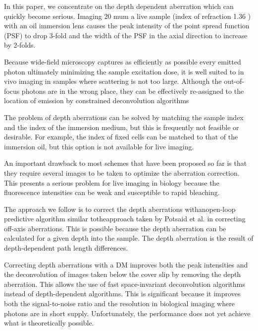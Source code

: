In this paper, we concentrate on the depth dependent aberration which can 
quickly become serious. Imaging 20 mum a live sample (index of refraction 1.36
) with an oil immersion lens causes the peak intensity of the point spread 
function (PSF) to drop 3-fold and the width of the PSF in the axial direction 
to increase by 2-folds. \cite{wide_AOM_FM_spehrical_correction} 

Because wide-field microscopy captures as efficiently as possible every 
emitted photon ultimately minimizing the sample excitation dose, it is well 
suited to in vivo imaging in samples where scattering is not too large. 
Although the out-of-focus photons are in the wrong place, they can be 
effectively re-assigned to the location of emission by constrained 
deconvolution algorithms \cite{wide_deconvolution}

The problem of depth aberrations can be solved by matching the sample index 
and the index of the immersion medium, but this is frequently not feasible or 
desirable. For example, the index of fixed cells can be matched to that of 
the immersion oil, but this option is not available for live imaging.

An important drawback to most schemes that have been proposed so far is that 
they require several images to be taken to optimize the aberration 
correction. This presents a serious problem for live imaging in biology 
because the fluorescence intensities can be weak and susceptible to rapid 
bleaching.

The approach we follow is to correct the depth aberrations withanopen-loop 
predictive algorithm similar totheapproach taken by Potsaid et al. in 
correcting off-axis aberrations. This is possible because the depth 
aberration can be calculated for a given depth into the sample. The depth 
aberration is the result of depth-dependent path length differences.

Correcting depth aberrations with a DM improves both the peak intensities and 
the deconvolution of images taken below the cover slip by removing the depth 
aberration. This allows the use of fast space-invariant deconvolution 
algorithms instead of depth-dependent algorithms. This is significant because 
it improves both the signal-to-noise ratio and the resolution in biological 
imaging where photons are in short supply. Unfortunately, the performance 
does not yet achieve what is theoretically possible.

